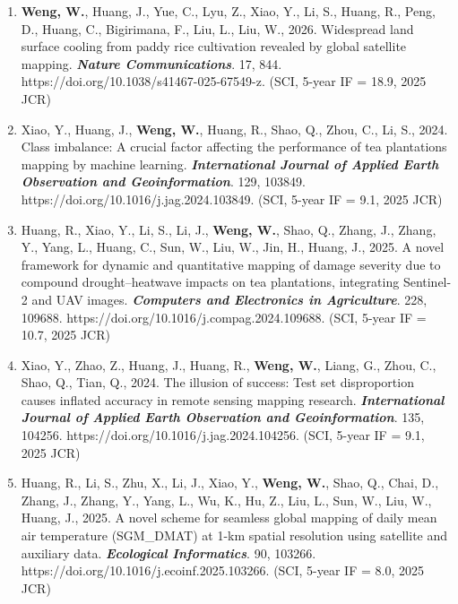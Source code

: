 \begin{enumerate}
    \item \textbf{Weng, W.}, Huang, J., Yue, C., Lyu, Z., Xiao, Y., Li, S., Huang, R., Peng, D., Huang, C., Bigirimana, F., Liu, L., Liu, W., 2026. Widespread land surface cooling from paddy rice cultivation revealed by global satellite mapping. \textit{\textbf{Nature Communications}}. 17, 844. https://doi.org/10.1038/s41467-025-67549-z. (SCI, 5-year IF = 18.9, 2025 JCR)
    
    \item Xiao, Y., Huang, J., \textbf{Weng, W.}, Huang, R., Shao, Q., Zhou, C., Li, S., 2024. Class imbalance: A crucial factor affecting the performance of tea plantations mapping by machine learning. \textit{\textbf{International Journal of Applied Earth Observation and Geoinformation}}. 129, 103849. https://doi.org/10.1016/j.jag.2024.103849. (SCI, 5-year IF = 9.1, 2025 JCR)

    \item Huang, R., Xiao, Y., Li, S., Li, J., \textbf{Weng, W.}, Shao, Q., Zhang, J., Zhang, Y., Yang, L., Huang, C., Sun, W., Liu, W., Jin, H., Huang, J., 2025. A novel framework for dynamic and quantitative mapping of damage severity due to compound drought--heatwave impacts on tea plantations, integrating Sentinel-2 and UAV images. \textit{\textbf{Computers and Electronics in Agriculture}}. 228, 109688. https://doi.org/10.1016/j.compag.2024.109688. (SCI, 5-year IF = 10.7, 2025 JCR)
    
    \item Xiao, Y., Zhao, Z., Huang, J., Huang, R., \textbf{Weng, W.}, Liang, G., Zhou, C., Shao, Q., Tian, Q., 2024. The illusion of success: Test set disproportion causes inflated accuracy in remote sensing mapping research. \textit{\textbf{International Journal of Applied Earth Observation and Geoinformation}}. 135, 104256. https://doi.org/10.1016/j.jag.2024.104256. (SCI, 5-year IF = 9.1, 2025 JCR)
    
    \item Huang, R., Li, S., Zhu, X., Li, J., Xiao, Y., \textbf{Weng, W.}, Shao, Q., Chai, D., Zhang, J., Zhang, Y., Yang, L., Wu, K., Hu, Z., Liu, L., Sun, W., Liu, W., Huang, J., 2025. A novel scheme for seamless global mapping of daily mean air temperature (SGM\_DMAT) at 1-km spatial resolution using satellite and auxiliary data. \textit{\textbf{Ecological Informatics}}. 90, 103266. https://doi.org/10.1016/j.ecoinf.2025.103266. (SCI, 5-year IF = 8.0, 2025 JCR)    
    

\end{enumerate}
